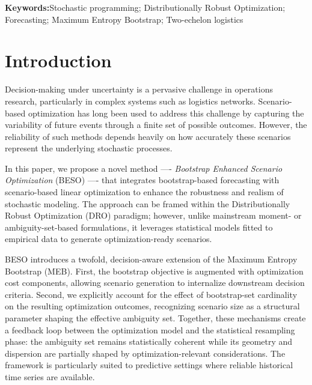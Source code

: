 \documentclass[11pt]{article}
\begin{document}
\noindent \textbf{Keywords:}Stochastic programming; Distributionally Robust Optimization; Forecasting; Maximum Entropy Bootstrap; Two-echelon logistics

\section{Introduction} \label{Sec:intro}

Decision-making under uncertainty is a pervasive challenge in operations research, particularly in complex systems such as logistics networks. Scenario-based optimization has long been used to address this challenge by capturing the variability of future events through a finite set of possible outcomes. However, the reliability of such methods depends heavily on how accurately these scenarios represent the underlying stochastic processes.

In this paper, we propose a novel method —- {\em Bootstrap Enhanced Scenario Optimization} (BESO) —- that integrates bootstrap-based forecasting with scenario-based linear optimization to enhance the robustness and realism of stochastic modeling. The approach can be framed within the Distributionally Robust Optimization (DRO) paradigm; however, unlike mainstream moment- or ambiguity-set-based formulations, it leverages statistical models fitted to empirical data to generate optimization-ready scenarios.

BESO introduces a twofold, decision-aware extension of the Maximum Entropy Bootstrap (MEB). First, the bootstrap objective is augmented with optimization cost components, allowing scenario generation to internalize downstream decision criteria. Second, we explicitly account for the effect of bootstrap-set cardinality on the resulting optimization outcomes, recognizing scenario size as a structural parameter shaping the effective ambiguity set. Together, these mechanisms create a feedback loop between the optimization model and the statistical resampling phase: the ambiguity set remains statistically coherent while its geometry and dispersion are partially shaped by optimization-relevant considerations. The framework is particularly suited to predictive settings where reliable historical time series are available.
\end{document}

